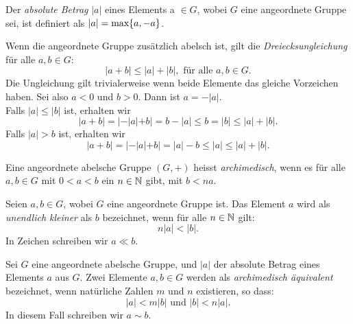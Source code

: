\begin{defn} \label{betrag}
Der \textit{absolute Betrag} $|a|$ eines Elements a $\in  G$, wobei $G$ eine angeordnete Gruppe sei, ist definiert als $|a| = \textup{max}\lbrace a, -a \rbrace$.
\end{defn}

Wenn die angeordnete Gruppe zusätzlich abelsch ist, gilt die \textit{Dreiecksungleichung} für alle $a, b \in G$:
\[|a+ b | \le |a| + |b|, \text{ für alle } a, b \in G.\]
Die Ungleichung gilt trivialerweise wenn beide Elemente das gleiche Vorzeichen haben. Sei also $a < 0$ und $b > 0$. Dann ist $a= -|a|$.\\
Falls $|a|\le |b|$ ist, erhalten wir
\[ |a + b |= |-|a|+b| = b - |a| \le b = |b|\le|a| + |b|. \]
Falls $|a| >b$ ist, erhalten wir 
\[|a+b| = |-|a| +b| = |a| - b \le |a|\le |a| + |b|.\]  
%
% 
%
%
%
%
%
\begin{defn}\label{archim}
Eine angeordnete abelsche Gruppe $\left(G,+\right)$ heisst \textit{archimedisch}, wenn es für alle $a, b \in G$  mit $0 < a < b$ ein $n \in \mathbb{N} $ gibt, mit $b < na$.
\end{defn}
%
%
\begin{defn}\label{uek}
Seien $a, b \in G$, wobei $G$ eine angeordnete Gruppe ist. Das Element $a$ wird als \textit{unendlich kleiner} als $b$ bezeichnet, wenn für alle $  n \in \mathbb{N} $ gilt: 
\[n|a| < |b|.\]
In Zeichen schreiben wir $a \ll b$.
\end{defn}
%
\begin{defn}\label{aae}
Sei $G$ eine angeordnete abelsche Gruppe, und $|a|$ der absolute Betrag eines Elements $a$ aus $G$. Zwei Elemente $a,b \in G$ werden als \textit{archimedisch äquivalent} bezeichnet, wenn natürliche Zahlen $m$ und $n$ existieren, so dass: 
\[|a| < m|b| \text{ und } |b| < n|a|.\]
In diesem Fall schreiben wir $ a \sim b $. 
\end{defn}
%

